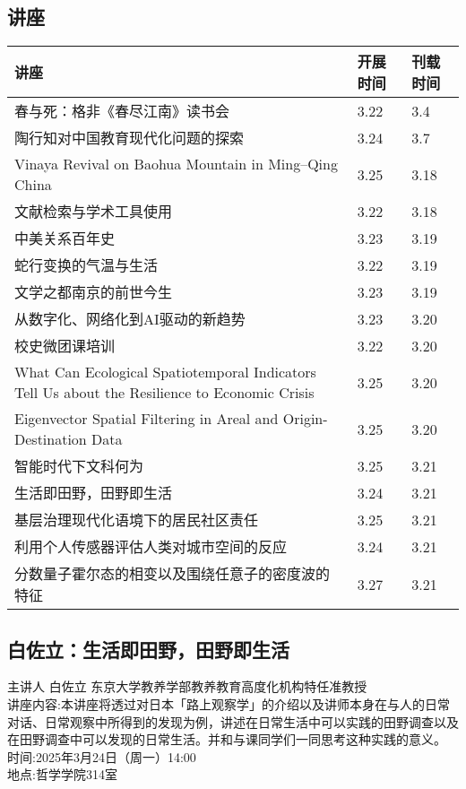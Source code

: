 \documentclass[letterpaper, 12pt]{article}
\begin{document}
\begin{multicols}{2}
\pagebreak

\section{讲座}
\begin{tabular}{|>{\centering\arraybackslash}m{}|m{}|m{}|}
    \hline
    讲座 & 开展时间 & 刊载时间\\
    \hline\hline
    春与死：格非《春尽江南》读书会 & 3.22 & 3.4\\\hline
    陶行知对中国教育现代化问题的探索 & 3.24 & 3.7\\\hline
    Vinaya Revival on Baohua Mountain in Ming–Qing China & 3.25 & 3.18 \\\hline
    文献检索与学术工具使用 & 3.22 & 3.18\\\hline
    中美关系百年史 & 3.23 & 3.19\\\hline
    蛇行变换的气温与生活 & 3.22 & 3.19\\\hline
    文学之都南京的前世今生 & 3.23 & 3.19\\\hline
    从数字化、网络化到AI驱动的新趋势 & 3.23 & 3.20\\\hline
    校史微团课培训 & 3.22 & 3.20\\\hline
    What Can Ecological Spatiotemporal Indicators Tell Us about the Resilience to Economic Crisis & 3.25 & 3.20\\\hline
    Eigenvector Spatial Filtering in Areal and Origin-Destination Data & 3.25 & 3.20\\\hline
    智能时代下文科何为 & 3.25 & 3.21\\\hline
    生活即田野，田野即生活 & 3.24 & 3.21\\\hline
    基层治理现代化语境下的居民社区责任 & 3.25 & 3.21\\\hline
    利用个人传感器评估人类对城市空间的反应 & 3.24 & 3.21\\\hline
    分数量子霍尔态的相变以及围绕任意子的密度波的特征 & 3.27 & 3.21\\\hline
\end{tabular}

\subsection{白佐立：生活即田野，田野即生活}
主讲人 白佐立 东京大学教养学部教养教育高度化机构特任准教授\\
讲座内容:本讲座将透过对日本「路上观察学」的介绍以及讲师本身在与人的日常对话、日常观察中所得到的发现为例，讲述在日常生活中可以实践的田野调查以及在田野调查中可以发现的日常生活。并和与课同学们一同思考这种实践的意义。\\
时间:2025年3月24日（周一）14:00\\
地点:哲学学院314室\\


\end{multicols}
\end{document}
